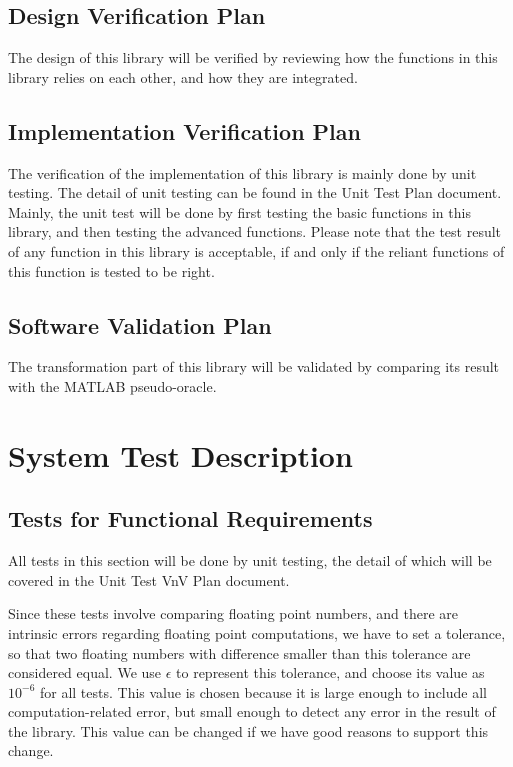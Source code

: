 \documentclass[12pt, titlepage]{article}
\begin{document}
\subsection{Design Verification Plan}

The design of this library will be verified by reviewing how the functions in this library relies on each other, and how they are integrated.

\subsection{Implementation Verification Plan}

The verification of the implementation of this library is mainly done by unit testing. The detail of unit testing can be found in the Unit Test Plan document. Mainly, the unit test will be done by first testing the basic functions in this library, and then testing the advanced functions. Please note that the test result of any function in this library is acceptable, if and only if the reliant functions of this function is tested to be right.
  


\subsection{Software Validation Plan}

The transformation part of this library will be validated by comparing its result with the MATLAB pseudo-oracle.

\section{System Test Description}
	
\subsection{Tests for Functional Requirements}
All tests in this section will be done by unit testing, the detail of which will be covered in the Unit Test VnV Plan document.

Since these tests involve comparing floating point numbers, and there are intrinsic errors regarding floating point computations, we have to set a tolerance, so that two floating numbers with difference smaller than this tolerance are considered equal. We use $\epsilon$ to represent this tolerance, and choose its value as $10^{-6}$ for all tests. This value is chosen because it is large enough to include all computation-related error, but small enough to detect any error in the result of the library. This value can be changed if we have good reasons to support this change.
\end{document}
